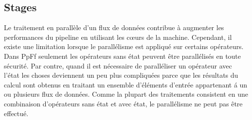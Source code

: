 \subsection{Stages}

Le traitement en parall\`ele d'un flux de donn\'ees contribue \`a augmenter les performances du pipeline en utilisant les cœurs de la machine. Cependant, il existe une limitation lorsque le parall\'elisme est appliqu\'e sur certains op\'erateurs. Dans PpFf seulement les op\'erateurs sans \'etat peuvent \^etre parall\'elis\'es en toute s\'ecurit\'e. Par contre, quand il est n\'ecessaire de parall\'eliser un op\'erateur avec l'\'etat les choses deviennent un peu plus compliqu\'ees parce que les r\'esultats du calcul sont obtenus en traitant un ensemble d'\'el\'ements d'entrée appartenant \'a un ou plusieurs flux de donn\'ees. Comme la plupart des traitements consistent en une combinaison d'op\'erateurs sans \'etat et avec \'etat, le parall\'elisme ne peut pas \^etre effectu\'e. 


